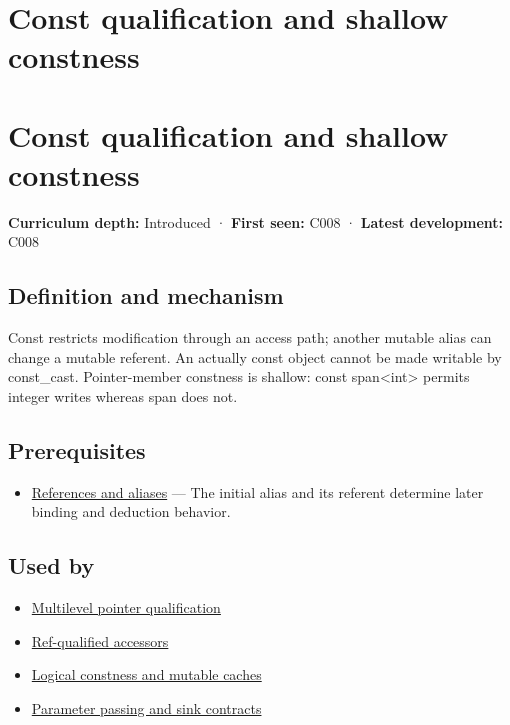 \hypertarget{appendix-c25d60fed375}{}
\section*{Const qualification and shallow constness}
\section{Const qualification and shallow constness}\label{appendix-c25d60fed375-const-qualification-and-shallow-constness}

\textbf{Curriculum depth:} Introduced · \textbf{First seen:} C008 · \textbf{Latest development:} C008

\subsection{Definition and mechanism}\label{appendix-c25d60fed375-definition-and-mechanism}

Const restricts modification through an access path; another mutable alias can change a mutable referent. An actually const object cannot be made writable by const\_cast. Pointer-member constness is shallow: const span\textless int\textgreater{} permits integer writes whereas span does not.

\subsection{Prerequisites}\label{appendix-c25d60fed375-prerequisites}

\begin{itemize}
\tightlist
\item
  \hyperref[appendix-d6d562ca9fbb]{References and aliases} --- The initial alias and its referent determine later binding and deduction behavior.
\end{itemize}

\subsection{Used by}\label{appendix-c25d60fed375-used-by}

\begin{itemize}
\tightlist
\item
  \hyperref[appendix-5e1a7561cd98]{Multilevel pointer qualification}
\item
  \hyperref[appendix-d42039b1d6f7]{Ref-qualified accessors}
\item
  \hyperref[appendix-f5593256bcaf]{Logical constness and mutable caches}
\item
  \hyperref[appendix-d5908f75721f]{Parameter passing and sink contracts}
\end{itemize}

